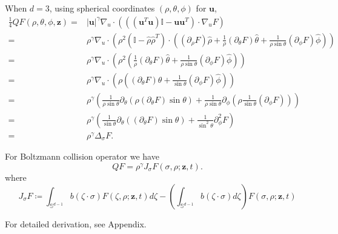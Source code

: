 \documentclass{article}
\numberwithin{equation}{section}
\begin{document}
\bigskip
When $d = 3$, using spherical coordinates $(\rho, \theta, \phi)$ for $\mathbf{u}$,
\begin{equation*}
    \begin{split}
        \frac{1}{4}QF(\rho, \theta, \phi,\mathbf{z}) = &|\mathbf{u}|^{\gamma}\nabla_{u}\cdot\left(\left((\mathbf{u}^{T}\mathbf{u})\mathbb{I}-\mathbf{u}\mathbf{u}^{T}\right)\cdot\nabla_{u}F\right)\\
        =&\rho^{\gamma}\nabla_{u}\cdot\left(\rho^{2}\left(\mathbb{I}-\hat{\rho}\hat{\rho}^{T}\right)\cdot\left((\partial_{\rho}F)\hat{\rho} + \frac{1}{\rho}(\partial_{\theta}F)\hat{\theta} + \frac{1}{\rho \sin{\theta}}(\partial_{\phi}F)\hat{\phi}\right)\right)\\
        =&\rho^{\gamma}\nabla_{u}\cdot\left(\rho^{2}\left( \frac{1}{\rho}(\partial_{\theta}F)\hat{\theta} + \frac{1}{\rho \sin{\theta}}(\partial_{\phi}F)\hat{\phi}\right)\right)\\
        =&\rho^{\gamma}\nabla_{u}\cdot\left(\rho\left((\partial_{\theta}F)\hat{\theta} + \frac{1}{\sin{\theta}}(\partial_{\phi}F)\hat{\phi}\right)\right)\\
        =&\rho^{\gamma}\left( \frac{1}{\rho \sin{\theta}}\partial_{\theta}(\rho(\partial_{\theta}F)\sin{\theta}) + \frac{1}{\rho \sin{\theta}}\partial_{\phi} (\rho\frac{1}{\sin{\theta}}(\partial_{\phi}F))\right)\\
        =&\rho^{\gamma}\left( \frac{1}{ \sin{\theta}}\partial_{\theta}((\partial_{\theta}F)\sin{\theta}) + \frac{1}{\sin^{2}{\theta}}\partial_{\phi}^{2} F\right)\\
        =&\rho^{\gamma}\Delta_{\sigma}F.
    \end{split}
\end{equation*}


For Boltzmann collision operator we have
\begin{equation*}
    Q F=\rho^{\gamma} J_{\sigma}F(\sigma, \rho;\mathbf{z},t) .
\end{equation*}
where
\begin{equation*}
    J_{\sigma} F \coloneqq \int_{\mathbb{S}^{d-1}} b(\zeta\cdot\sigma) F(\zeta, \rho;\mathbf{z},t) d\zeta- \left(\int_{\mathbb{S}^{d-1}} b(\zeta\cdot\sigma) d\zeta\right) F(\sigma, \rho;\mathbf{z},t)
\end{equation*}




For detailed derivation, see Appendix.
\end{document}
